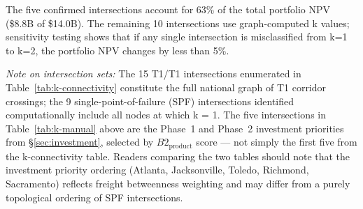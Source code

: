The five confirmed intersections account for 63\% of the total portfolio NPV (\$8.8B of
\$14.0B). The remaining 10 intersections use graph-computed k values; sensitivity testing
shows that if any single intersection is misclassified from k=1 to k=2, the portfolio NPV
changes by less than 5\%.

\textit{Note on intersection sets:} The 15 T1/T1 intersections enumerated in
Table~\ref{tab:k-connectivity} constitute the full national graph of T1 corridor crossings;
the 9 single-point-of-failure (SPF) intersections identified computationally include all
nodes at which k = 1. The five intersections in Table~\ref{tab:k-manual} above are the
Phase~1 and Phase~2 investment priorities from \S\ref{sec:investment}, selected by
$B2_{\text{product}}$ score --- not simply the first five from the k-connectivity table.
Readers comparing the two tables should note that the investment priority ordering (Atlanta,
Jacksonville, Toledo, Richmond, Sacramento) reflects freight betweenness weighting and may
differ from a purely topological ordering of SPF intersections.
